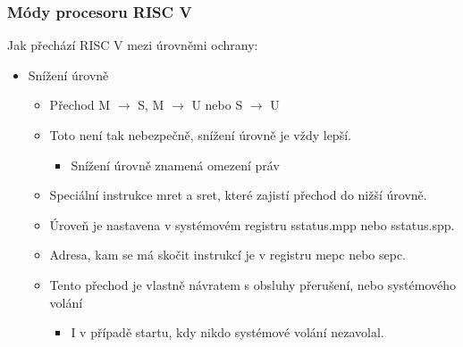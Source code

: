 \documentclass{beamer}
\begin{document}
\begin{frame}
\frametitle{Módy procesoru RISC V}

Jak přechází RISC V mezi úrovněmi ochrany:
\begin{itemize}
\item Snížení úrovně
\begin{itemize}
\item Přechod M $\rightarrow$ S, M $\rightarrow$ U nebo S $\rightarrow$ U
\item Toto není tak nebezpečně, snížení úrovně je vždy lepší.
\begin{itemize}
\item Snížení úrovně znamená omezení práv
\end{itemize}
\item Speciální instrukce mret a sret, které zajistí přechod do nižší úrovně.
\item Úroveň je nastavena v systémovém registru sstatus.mpp nebo sstatus.spp.
\item Adresa, kam se má skočit instrukcí je v registru mepc nebo sepc.
\item Tento přechod je vlastně návratem s obsluhy přerušení, nebo systémového volání
\begin{itemize}
\item I v případě startu, kdy nikdo systémové volání nezavolal.
\end{itemize}
\end{itemize}
\end{itemize}

\end{frame}
\end{document}

